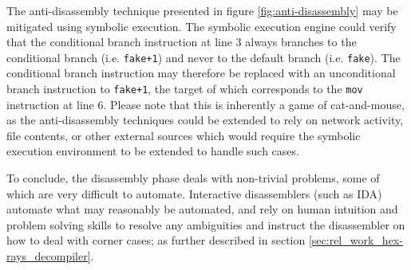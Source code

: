 The anti-disassembly technique presented in figure \ref{fig:anti-disassembly} may be mitigated using symbolic execution. The symbolic execution engine could verify that the conditional branch instruction at line 3 always branches to the conditional branch (i.e. \texttt{fake+1}) and never to the default branch (i.e. \texttt{fake}). The conditional branch instruction may therefore be replaced with an unconditional branch instruction to \texttt{fake+1}, the target of which corresponds to the \texttt{mov} instruction at line 6. Please note that this is inherently a game of cat-and-mouse, as the anti-disassembly techniques could be extended to rely on network activity, file contents, or other external sources which would require the symbolic execution environment to be extended to handle such cases.

To conclude, the disassembly phase deals with non-trivial problems, some of which are very difficult to automate. Interactive disassemblers (such as IDA) automate what may reasonably be automated, and rely on human intuition and problem solving skills to resolve any ambiguities and instruct the disassembler on how to deal with corner cases; as further described in section \ref{sec:rel_work_hex-rays_decompiler}.
